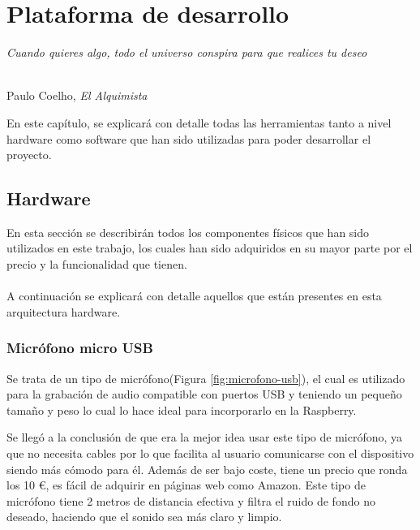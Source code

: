 \chapter{Plataforma de desarrollo}
\label{cap:capitulo4}


\begin{flushright}
\begin{minipage}[]{10cm}
\emph{Cuando quieres algo, todo el universo conspira para que realices tu deseo}\\
\end{minipage}\\

Paulo Coelho, \textit{El Alquimista}\\
\end{flushright}

\vspace{1cm}

En este capítulo, se explicará con detalle todas las herramientas tanto a nivel hardware como software que han sido utilizadas para poder desarrollar el proyecto.


\section{Hardware}
\label{sec:hardware}

En esta sección se describirán todos los componentes físicos que han sido utilizados en este trabajo, los cuales han sido adquiridos en su mayor parte por el precio y la funcionalidad que tienen.\\ \\
A continuación se explicará con detalle aquellos que están presentes en esta arquitectura hardware.

\subsection{Micrófono micro USB}
\label{subsec:micro}

Se trata de un tipo de micrófono(Figura \ref{fig:microfono-usb}), el cual es utilizado para la grabación de audio compatible con puertos USB y teniendo un pequeño tamaño y peso lo cual lo hace ideal para incorporarlo en la Raspberry. 


Se llegó a la conclusión de que era la mejor idea usar este tipo de micrófono, ya que no necesita cables por lo que facilita al usuario comunicarse con el dispositivo siendo más cómodo para él. Además de ser bajo coste, tiene un precio que ronda los 10 \euro, es fácil de adquirir en páginas web como Amazon. Este tipo de micrófono tiene 2 metros de distancia efectiva y filtra el ruido de fondo no deseado, haciendo que el sonido sea más claro y limpio.


